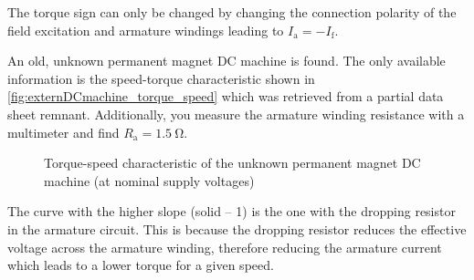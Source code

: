 \begin{solutionblock}
  The torque sign can only be changed by changing the connection polarity of the field excitation and armature windings leading to $I_\mathrm{a} = -I_\mathrm{f}$. 
\end{solutionblock}


An old, unknown permanent magnet DC machine is found. The only available information is the speed-torque characteristic shown in \autoref{fig:externDCmachine_torque_speed} which was retrieved from a partial data sheet remnant. Additionally, you measure the armature winding resistance with a multimeter and find $R_\mathrm{a} = \SI{1.5}{\ohm}$.
\begin{figure}[h]
  \centering
\caption{Torque-speed characteristic of the unknown permanent magnet DC machine (at nominal supply voltages)}
\label{fig:externDCmachine_torque_speed}
\end{figure}
%

\begin{solutionblock}
  The curve with the higher slope (solid -- 1) is the one with the dropping resistor in the armature circuit. This is because the dropping resistor reduces the effective voltage across the armature winding, therefore reducing the armature current which leads to a lower torque for a given speed. 
\end{solutionblock}

